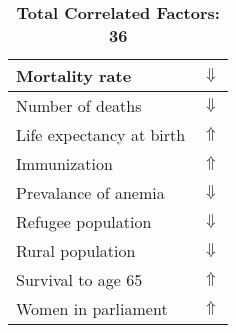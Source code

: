 \documentclass[12pt,notitlepage,oneside]{report}
\begin{document}
\begin{table}[!htb]
\begin{tabular}{|l|l|}
Mortality rate & $\Downarrow$\\ \hline
Number of deaths & $\Downarrow$\\ \hline
Life expectancy at birth & $\Uparrow$\\ \hline
Immunization & $\Uparrow$\\ \hline
Prevalance of anemia & $\Downarrow$\\ \hline
Refugee population & $\Downarrow$\\ \hline
Rural population & $\Downarrow$\\ \hline
Survival to age 65 & $\Uparrow$\\ \hline
Women in parliament & $\Uparrow$\\ \hline
\end{tabular}
\caption*{\textbf{Total Correlated Factors: 36}}
\end{table}
\clearpage
\end{document}
